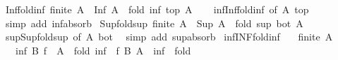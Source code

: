 \begin{isabellebody}
\ Inf{\isacharunderscore}{\kern0pt}fold{\isacharunderscore}{\kern0pt}inf{\isacharcolon}{\kern0pt}\ {\isachardoublequoteopen}finite\ A\ {\isasymLongrightarrow}\ Inf\ A\ {\isacharequal}{\kern0pt}\ fold\ inf\ top\ A{\isachardoublequoteclose}\isanewline
%
\isadelimproof
\ \ %
\endisadelimproof
%
\isatagproof
{}\isamarkupfalse%
\ inf{\isacharunderscore}{\kern0pt}Inf{\isacharunderscore}{\kern0pt}fold{\isacharunderscore}{\kern0pt}inf\ {\isacharbrackleft}{\kern0pt}of\ A\ top{\isacharbrackright}{\kern0pt}\ \isamarkupfalse%
\ {\isacharparenleft}{\kern0pt}simp\ add{\isacharcolon}{\kern0pt}\ inf{\isacharunderscore}{\kern0pt}absorb{}{\isacharparenright}{\kern0pt}%
\endisatagproof
{\isafoldproof}%
%
\isadelimproof
\isanewline
%
\endisadelimproof
\isanewline
{}\isamarkupfalse%
\ Sup{\isacharunderscore}{\kern0pt}fold{\isacharunderscore}{\kern0pt}sup{\isacharcolon}{\kern0pt}\ {\isachardoublequoteopen}finite\ A\ {\isasymLongrightarrow}\ Sup\ A\ {\isacharequal}{\kern0pt}\ fold\ sup\ bot\ A{\isachardoublequoteclose}\isanewline
%
\isadelimproof
\ \ %
\endisadelimproof
%
\isatagproof
{}\isamarkupfalse%
\ sup{\isacharunderscore}{\kern0pt}Sup{\isacharunderscore}{\kern0pt}fold{\isacharunderscore}{\kern0pt}sup\ {\isacharbrackleft}{\kern0pt}of\ A\ bot{\isacharbrackright}{\kern0pt}\ \isamarkupfalse%
\ {\isacharparenleft}{\kern0pt}simp\ add{\isacharcolon}{\kern0pt}\ sup{\isacharunderscore}{\kern0pt}absorb{}{\isacharparenright}{\kern0pt}%
\endisatagproof
{\isafoldproof}%
%
\isadelimproof
\isanewline
%
\endisadelimproof
\isanewline
{}\isamarkupfalse%
\ inf{\isacharunderscore}{\kern0pt}INF{\isacharunderscore}{\kern0pt}fold{\isacharunderscore}{\kern0pt}inf{\isacharcolon}{\kern0pt}\isanewline
\ \ \ {\isachardoublequoteopen}finite\ A{\isachardoublequoteclose}\isanewline
\ \ \ {\isachardoublequoteopen}inf\ B\ {\isacharparenleft}{\kern0pt}{\isasymSqinter}{\isacharparenleft}{\kern0pt}f\ {\isacharbackquote}{\kern0pt}\ A{\isacharparenright}{\kern0pt}{\isacharparenright}{\kern0pt}\ {\isacharequal}{\kern0pt}\ fold\ {\isacharparenleft}{\kern0pt}inf\ {\isasymcirc}\ f{\isacharparenright}{\kern0pt}\ B\ A{\isachardoublequoteclose}\ {\isacharparenleft}{\kern0pt}\ {\isachardoublequoteopen}{\isacharquery}{\kern0pt}inf\ {\isacharequal}{\kern0pt}\ {\isacharquery}{\kern0pt}fold{\isachardoublequoteclose}{\isacharparenright}{\kern0pt}\isanewline
%
\isadelimproof
%
\endisadelimproof
%
\isatagproof
{}\isamarkupfalse%
\ {\isacharminus}{\kern0pt}\isanewline

\end{isabellebody}
